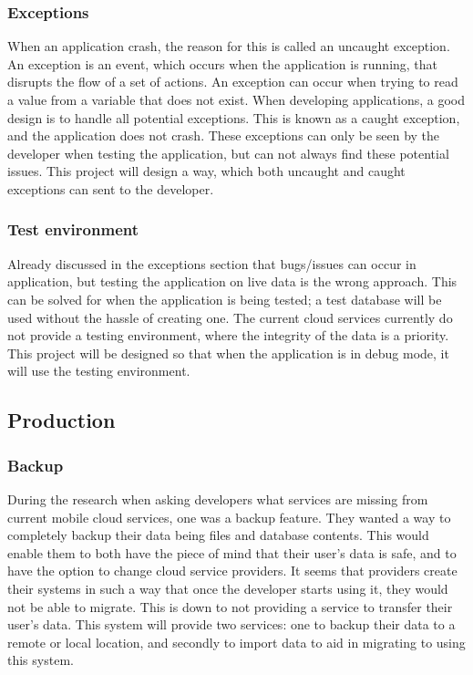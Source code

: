 \subsubsection{Exceptions} \label{testing subsection}

When an application crash, the reason for this is called an uncaught exception. An exception is an event, which occurs when the application is running, that disrupts the flow of a set of actions. An exception can occur when trying to read a value from a variable that does not exist. When developing applications, a good design is to handle all potential exceptions. This is known as a caught exception, and the application does not crash. These exceptions can only be seen by the developer when testing the application, but can not always find these potential issues. This project will design a way, which both uncaught and caught exceptions can sent to the developer.

\subsubsection{Test environment} \label{d-t:test_enviornment}

Already discussed in the exceptions section that bugs/issues can occur in application, but testing the application on live data is the wrong approach. This can be solved for when the application is being tested; a test database will be used without the hassle of creating one. The current cloud services currently do not provide a testing environment, where the integrity of the data is a priority. This project will be designed so that when the application is in debug mode, it will use the testing environment.

\subsection{Production}

\subsubsection{Backup} \label{d-p:backup}

During the research when asking developers what services are missing from current mobile cloud services, one was a backup feature. They wanted a way to completely backup their data being files and database contents. This would enable them to both have the piece of mind that their user's data is safe, and to have the option to change cloud service providers. It seems that providers create their systems in such a way that once the developer starts using it, they would not be able to migrate. This is down to not providing a service to transfer their user's data. This system will provide two services: one to backup their data to a remote or local location, and secondly to import data to aid in migrating to using this system.

